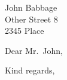\documentclass[10pt,a4paper]{letter}
\begin{document}
 
\begin{letter}{John Babbage\\Other Street 8\\2345 Place} 

\opening{Dear Mr.\ John,} 

\lipsum[1-2]

\closing{Kind regards,} 

\end{letter} 
\end{document}
